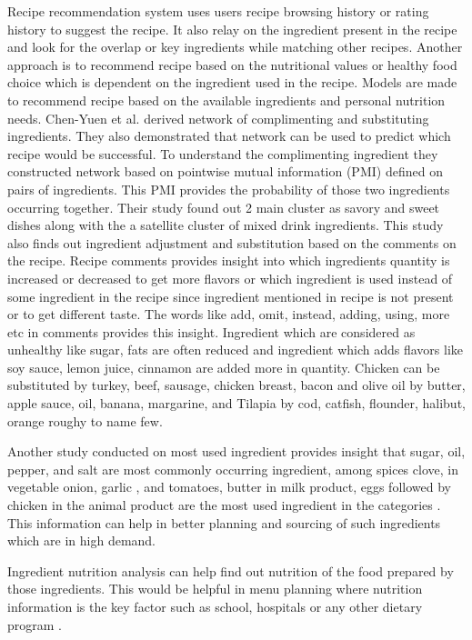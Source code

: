 \documentclass[sigconf]{acmart}
\begin{document}
Recipe recommendation system uses users recipe browsing history or rating history to suggest the recipe. It also relay on the ingredient present in the recipe and look for the overlap or key ingredients while matching other recipes. Another approach is to recommend recipe based on the nutritional values or healthy food choice which is dependent on the ingredient used in the recipe. Models are made to recommend recipe based on the available ingredients and personal nutrition needs. Chen-Yuen et al. \cite{www-orxiv} derived network of complimenting and substituting ingredients. They also demonstrated that network can be used to predict which recipe would be successful. To understand the complimenting ingredient they constructed network based on pointwise mutual information (PMI) defined on pairs of ingredients. This PMI provides the probability of those two ingredients occurring together. Their study found out 2 main cluster as savory and sweet dishes along with the a satellite cluster of mixed drink ingredients. This study also finds out ingredient adjustment and substitution based on the comments on the recipe. Recipe comments provides insight into which ingredients quantity is  increased or decreased to get more flavors or which ingredient is used instead of some ingredient in the recipe since ingredient mentioned in recipe is not present or to get different taste. The words like add, omit, instead, adding, using, more etc in comments provides this insight. Ingredient which are considered as unhealthy like sugar, fats are often reduced and ingredient which adds flavors like soy sauce, lemon juice, cinnamon are added more in quantity. Chicken can be substituted by turkey, beef, sausage, chicken breast, bacon and olive oil by butter, apple sauce, oil, banana, margarine, and Tilapia by cod, catfish, flounder, halibut, orange roughy to name few.

Another study conducted on most used ingredient provides insight that sugar, oil, pepper, and salt are most commonly occurring ingredient, among spices clove, in vegetable onion,  garlic , and tomatoes, butter in milk product, eggs followed by chicken in the animal product are the most used ingredient in the categories \cite{Chatterjee2016}. This information can help in better planning and sourcing of such ingredients which are in high demand.

Ingredient nutrition analysis can help find out nutrition of the food prepared by those ingredients. This would be helpful in menu planning where nutrition information is the key factor such as school, hospitals or any other dietary program \cite{www-onlinelibrary}.
\end{document}

